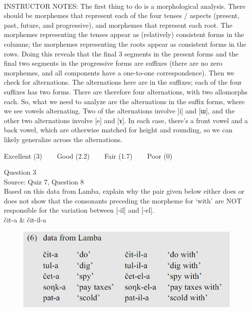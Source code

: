 \documentclass[12pt]{article}
\begin{document}
~\\
INSTRUCTOR NOTES: The first thing to do is a morphological analysis. There should be morphemes that represent each of the four tenses / aspects (present, past, future, and progressive), and morphemes that represent each root. The morphemes representing the tenses appear as (relatively) consistent forms in the columns; the morphemes representing the roots appear as consistent forms in the rows. Doing this reveals that the final 3 segments in the present forms and the final two segments in the progressive forms are suffixes (there are no zero morphemes, and all components have a one-to-one correspondence). Then we check for alternations. The alternations here are in the suffixes; each of the four suffixes has two forms. There are therefore four alternations, with two allomorphs each. So, what we need to analyze are the alternations in the suffix forms, where we see vowels alternating. Two of the alternations involve [i] and [ɯ], and the other two alternations involve [e] and [ɤ]. In each case, there’s a front vowel and a back vowel, which are otherwise matched for height and rounding, so we can likely generalize across the alternations.


\vfill
Excellent (3) ~~~ Good (2.2) ~~~ Fair (1.7) ~~~ Poor (0)
\newpage

{\large Question 3}\\

Source: Quiz 7, Question 8\\

Based on this data from Lamba, explain why the pair given below either does or does not show that the consonants preceding the morpheme for `with' are NOT responsible for the variation between [-il] and [-el].\\

čit-a \& čit-il-a

\begin{figure}[H]
\includegraphics{../images/peng119_lamba.png}
\end{figure}
\end{document}
